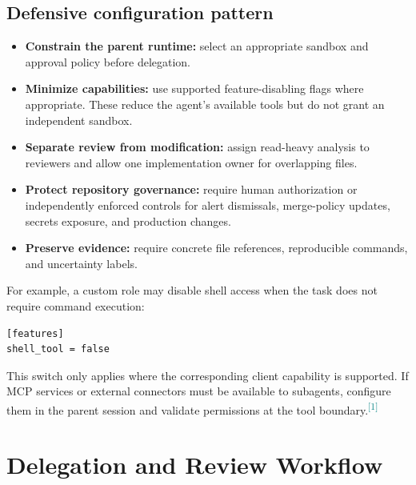 \documentclass[11pt,letterpaper]{article}
\newcommand{\codexsource}[1]{\textsuperscript{\textcolor{Teal}{[#1]}}}
\begin{document}
\subsection{Defensive configuration pattern}
\begin{itemize}
  \item \textbf{Constrain the parent runtime:} select an appropriate sandbox and approval policy before delegation.
  \item \textbf{Minimize capabilities:} use supported feature-disabling flags where appropriate. These reduce the agent's available tools but do not grant an independent sandbox.
  \item \textbf{Separate review from modification:} assign read-heavy analysis to reviewers and allow one implementation owner for overlapping files.
  \item \textbf{Protect repository governance:} require human authorization or independently enforced controls for alert dismissals, merge-policy updates, secrets exposure, and production changes.
  \item \textbf{Preserve evidence:} require concrete file references, reproducible commands, and uncertainty labels.
\end{itemize}

For example, a custom role may disable shell access when the task does not require command execution:
\begin{listing}[htbp]
\caption{Optional feature restriction inside a custom agent TOML file.}
\begin{verbatim}
[features]
shell_tool = false
\end{verbatim}
\end{listing}
This switch only applies where the corresponding client capability is supported. If MCP services or external connectors must be available to subagents, configure them in the parent session and validate permissions at the tool boundary.\codexsource{1}

\section{Delegation and Review Workflow}
\end{document}

